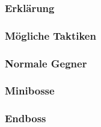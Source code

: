 \documentclass[fontsize=12pt,paper=a4,twoside]{scrartcl}
\begin{document}
\subsubsection{Erklärung}

\subsubsection{Mögliche Taktiken}

\subsubsection{Normale Gegner}

\subsubsection{Minibosse}

\subsubsection{Endboss}
\end{document}
